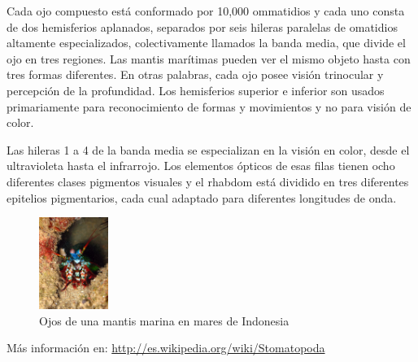 \documentclass[10pt,twocolumn]{article}
\begin{document}
Cada ojo compuesto está conformado por 10,000 ommatidios y cada uno consta de dos hemisferios aplanados, separados por seis hileras paralelas de omatidios altamente especializados, colectivamente llamados la banda media, que divide el ojo en tres regiones. Las mantis marítimas pueden ver el mismo objeto hasta con tres formas diferentes. En otras palabras, cada ojo posee visión trinocular y percepción de la profundidad. Los hemisferios superior e inferior son usados primariamente para reconocimiento de formas y movimientos y no para visión de color.

Las hileras 1 a 4 de la banda media se especializan en la visión en color, desde el ultravioleta hasta el infrarrojo. Los elementos ópticos de esas filas tienen ocho diferentes clases pigmentos visuales y el rhabdom está dividido en tres diferentes epitelios pigmentarios, cada cual adaptado para diferentes longitudes de onda.

\begin{figure}[h] 
	\centering
	\includegraphics[width=0.2\textwidth]{img/indonesian_mantis_shrimp.jpg}
	\caption{Ojos de una mantis marina en mares de Indonesia}
\end{figure}





Más información en:  \url{http://es.wikipedia.org/wiki/Stomatopoda}
\end{document}
